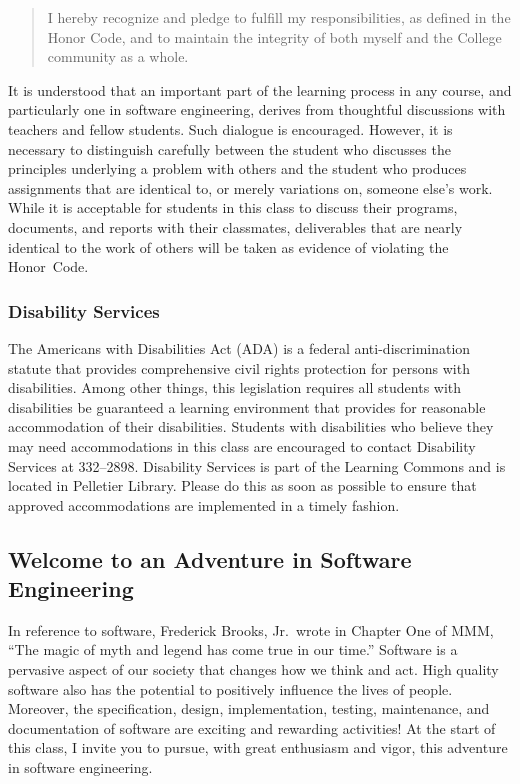 \documentclass[11pt]{article}
\begin{document}
\vspace*{-.10in}
%
\begin{quote}
%
  I hereby recognize and pledge to fulfill my responsibilities, as defined in
  the Honor Code, and to maintain the integrity of both myself and the College
  community as a whole.
%
\end{quote}
%
\vspace*{-.10in}

\noindent It is understood that an important part of the learning process in any
course, and particularly one in software engineering, derives from thoughtful
discussions with teachers and fellow students. Such dialogue is encouraged.
However, it is necessary to distinguish carefully between the student who
discusses the principles underlying a problem with others and the student who
produces assignments that are identical to, or merely variations on, someone
else's work. While it is acceptable for students in this class to discuss their
programs, documents, and reports with their classmates, deliverables that are
nearly identical to the work of others will be taken as evidence of violating
the \mbox{Honor Code}.

\subsubsection*{Disability Services}

The Americans with Disabilities Act (ADA) is a federal anti-discrimination
statute that provides comprehensive civil rights protection for persons with
disabilities. Among other things, this legislation requires all students with
disabilities be guaranteed a learning environment that provides for reasonable
accommodation of their disabilities. Students with disabilities who believe they
may need accommodations in this class are encouraged to contact Disability
Services at 332--2898. Disability Services is part of the Learning Commons and
is located in Pelletier Library. Please do this as soon as possible to ensure
that approved accommodations are implemented in a timely fashion.

\subsection*{Welcome to an Adventure in Software Engineering}

In reference to software, Frederick Brooks, Jr.\ wrote in Chapter One of MMM,
``The magic of myth and legend has come true in our time.'' Software is a
pervasive aspect of our society that changes how we think and act. High quality
software also has the potential to positively influence the lives of people.
Moreover, the specification, design, implementation, testing, maintenance, and
documentation of software are exciting and rewarding activities! At the start of
this class, I invite you to pursue, with great enthusiasm and vigor, this
adventure in software engineering.
\end{document}
